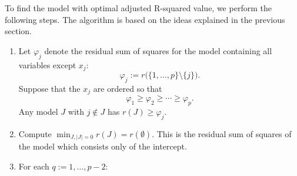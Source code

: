 \documentclass[
  a4paper,
]{article}
\theoremstyle{definition}
\theoremstyle{definition}
\theoremstyle{definition}
\theoremstyle{definition}
\theoremstyle{remark}
\begin{document}
To find the model with optimal adjusted R-squared value, we perform the
following steps. The algorithm is based on the ideas explained in the previous
section.

\begin{enumerate}
\def\labelenumi{\Alph{enumi}.}
\item
  Let \(\varphi_j\) denote the residual sum of squares for the model containing
  all variables except \(x_j\):
  \begin{equation*}
        \varphi_j := r\bigl( \{ 1, \ldots, p \} \setminus \{ j \} \bigr).
    \end{equation*}
  Suppose that the \(x_j\) are ordered so that
  \begin{equation*}
        \varphi_1 \geq \varphi_2 \geq \cdots \geq \varphi_p.
    \end{equation*}
  Any model \(J\) with \(j \notin J\) has \(r(J) \geq \varphi_j\).
\item
  Compute \(\min_{J, |J|=0} r(J) = r(\emptyset)\). This is the residual
  sum of squares of the model which consists only of the intercept.
\item
  For each \(q := 1, \ldots, p-2\):


\end{enumerate}
\end{document}
